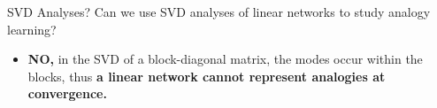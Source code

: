 \documentclass{beamer}
\begin{document}
\begin{frame}{SVD Analyses?}
Can we use SVD analyses of linear networks to study analogy learning?
\begin{itemize}
    \item<1-> \textbf{NO,} in the SVD of a block-diagonal matrix, the modes occur within the blocks, thus \textbf{a linear network cannot represent analogies at convergence.}
\end{itemize}
\end{frame}
\end{document}
